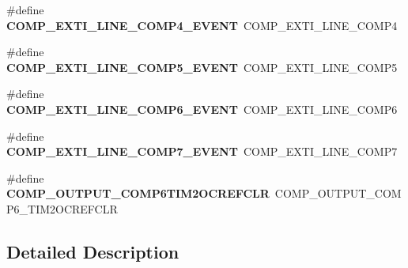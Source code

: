 \begin{DoxyCompactItemize}
\item 
\hypertarget{group___h_a_l___c_o_m_p___aliased___defines_ga7e682dbcdc2deedaa2b2854b7256b742}{\#define {\bfseries C\-O\-M\-P\-\_\-\-E\-X\-T\-I\-\_\-\-L\-I\-N\-E\-\_\-\-C\-O\-M\-P4\-\_\-\-E\-V\-E\-N\-T}~C\-O\-M\-P\-\_\-\-E\-X\-T\-I\-\_\-\-L\-I\-N\-E\-\_\-\-C\-O\-M\-P4}\label{group___h_a_l___c_o_m_p___aliased___defines_ga7e682dbcdc2deedaa2b2854b7256b742}

\item 
\hypertarget{group___h_a_l___c_o_m_p___aliased___defines_gad0def6714ebe83bd131d6f62f12bf6b7}{\#define {\bfseries C\-O\-M\-P\-\_\-\-E\-X\-T\-I\-\_\-\-L\-I\-N\-E\-\_\-\-C\-O\-M\-P5\-\_\-\-E\-V\-E\-N\-T}~C\-O\-M\-P\-\_\-\-E\-X\-T\-I\-\_\-\-L\-I\-N\-E\-\_\-\-C\-O\-M\-P5}\label{group___h_a_l___c_o_m_p___aliased___defines_gad0def6714ebe83bd131d6f62f12bf6b7}

\item 
\hypertarget{group___h_a_l___c_o_m_p___aliased___defines_ga92c1033ac0c380c9f879660af7c62616}{\#define {\bfseries C\-O\-M\-P\-\_\-\-E\-X\-T\-I\-\_\-\-L\-I\-N\-E\-\_\-\-C\-O\-M\-P6\-\_\-\-E\-V\-E\-N\-T}~C\-O\-M\-P\-\_\-\-E\-X\-T\-I\-\_\-\-L\-I\-N\-E\-\_\-\-C\-O\-M\-P6}\label{group___h_a_l___c_o_m_p___aliased___defines_ga92c1033ac0c380c9f879660af7c62616}

\item 
\hypertarget{group___h_a_l___c_o_m_p___aliased___defines_ga7f18b1fe252971b1976e906c2c7d4be7}{\#define {\bfseries C\-O\-M\-P\-\_\-\-E\-X\-T\-I\-\_\-\-L\-I\-N\-E\-\_\-\-C\-O\-M\-P7\-\_\-\-E\-V\-E\-N\-T}~C\-O\-M\-P\-\_\-\-E\-X\-T\-I\-\_\-\-L\-I\-N\-E\-\_\-\-C\-O\-M\-P7}\label{group___h_a_l___c_o_m_p___aliased___defines_ga7f18b1fe252971b1976e906c2c7d4be7}

\item 
\hypertarget{group___h_a_l___c_o_m_p___aliased___defines_ga74dbd1a72efdaee104678a256383976f}{\#define {\bfseries C\-O\-M\-P\-\_\-\-O\-U\-T\-P\-U\-T\-\_\-\-C\-O\-M\-P6\-T\-I\-M2\-O\-C\-R\-E\-F\-C\-L\-R}~C\-O\-M\-P\-\_\-\-O\-U\-T\-P\-U\-T\-\_\-\-C\-O\-M\-P6\-\_\-\-T\-I\-M2\-O\-C\-R\-E\-F\-C\-L\-R}\label{group___h_a_l___c_o_m_p___aliased___defines_ga74dbd1a72efdaee104678a256383976f}

\end{DoxyCompactItemize}


\subsection{Detailed Description}

